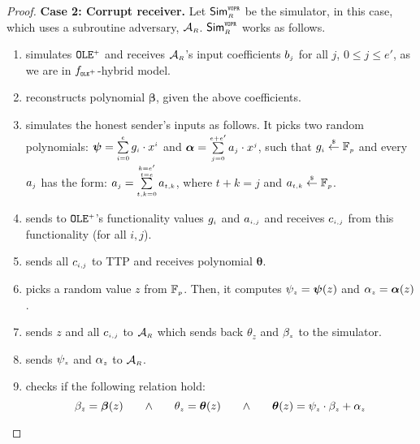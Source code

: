 \begin{proof}
\noindent\textbf{Case 2: Corrupt receiver.}  Let $\mathsf{Sim}^{\scriptscriptstyle\mathtt{VOPR}}_{\scriptscriptstyle R}$ be the simulator, in this case, which uses a subroutine adversary, $\mathcal{A}_{\scriptscriptstyle R}$. $\mathsf{Sim}^{\scriptscriptstyle \mathtt{VOPR}}_{\scriptscriptstyle R}$ works as follows. 
%
\begin{enumerate}
%
\item simulates ${\mathtt{OLE}^{\scriptscriptstyle +}}$ and receives $\mathcal{A}_{\scriptscriptstyle R}$'s input coefficients $b_{\scriptscriptstyle j}$ for all $j$, $0\leq j \leq e'$, as we are in $f_{\scriptscriptstyle \mathtt{OLE}^{\scriptscriptstyle +}}$-hybrid model.
%
\item reconstructs polynomial $\bm \beta$, given the above coefficients. 
%
\item simulates the honest sender's inputs as follows. 
It picks two random polynomials: ${\bm\psi}=\sum\limits^{\scriptscriptstyle e}_{\scriptscriptstyle i=0}{g}_{\scriptscriptstyle i}\cdot x^{\scriptscriptstyle i}$ and  ${\bm\alpha}=\sum\limits^{\scriptscriptstyle e+e'}_{\scriptscriptstyle j=0}{a}_{\scriptscriptstyle j}\cdot x^{\scriptscriptstyle j}$, such that ${g}_{\scriptscriptstyle i}\stackrel{\scriptscriptstyle \$}\leftarrow \mathbb{F}_{\scriptscriptstyle p}$ and  every $a_{\scriptscriptstyle j}$ has the  form: $a_{\scriptscriptstyle j}=\sum\limits^{\substack{\scriptscriptstyle k=e'\\ \scriptscriptstyle t=e}}_{\scriptscriptstyle t,k=0} a_{\scriptscriptstyle t,k}$,  where $t+k=j$ and $a_{\scriptscriptstyle t,k}\stackrel{\scriptscriptstyle \$}\leftarrow \mathbb{F}_{\scriptscriptstyle p}$. 
\item sends to ${\mathtt{OLE}^{\scriptscriptstyle +}}$'s functionality values $g_{\scriptscriptstyle i}$ and $a_{\scriptscriptstyle i,j}$ and receives   $c_{\scriptscriptstyle i,j}$ from this functionality (for all $i,j$).
%
\item sends all ${c}_{\scriptscriptstyle i,j}$ to TTP and receives polynomial ${\bm\theta}$. 
%
\item picks a random value $ z$ from $\mathbb{F}_{\scriptscriptstyle p}$. Then, it computes $ \psi_{\scriptscriptstyle  z} = {\bm\psi}(  z)$ and $\alpha_{\scriptscriptstyle  z}= {\bm\alpha}(z)$. 
%
\item sends $ z$ and all ${c}_{\scriptscriptstyle i,j}$ to $\mathcal{A}_{\scriptscriptstyle R}$ which sends back $\theta_{ z}$ and $\beta_{\scriptscriptstyle z}$ to the simulator. 
%
\item sends  $ \psi_{\scriptscriptstyle  z}$ and $\alpha_{\scriptscriptstyle z}$ to $\mathcal{A}_{\scriptscriptstyle R}$. 
%
\item checks if the following relation hold:
%
\begin{equation}\label{equ::beta}
 \beta_{\scriptscriptstyle \bar z}={\bm\beta}( z) \hspace{6mm} \wedge \hspace{6mm} \theta_{\scriptscriptstyle  z}={\bm\theta}( z) \hspace{6mm}\wedge\hspace{6mm} {\bm\theta}( z)=  \psi_{\scriptscriptstyle  z}\cdot \beta_{\scriptscriptstyle  z}+\alpha_{\scriptscriptstyle  z}
 \end{equation}

\end{enumerate}
\end{proof}
